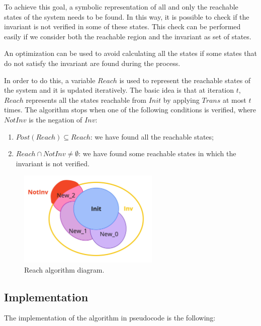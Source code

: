 \documentclass[12pt]{article}
\begin{document}
    To achieve this goal, a symbolic representation of all and only the reachable states of the system needs to be found.
    In this way, it is possible to check if the invariant is not verified in some of these states.
    This check can be performed easily if we consider both the reachable region and the invariant as set of states.

    An optimization can be used to avoid calculating all the states if some states that do not satisfy the invariant are found during the process.

    In order to do this, a variable $Reach$ is used to represent the reachable states of the system and it is updated iteratively.
    The basic idea is that at iteration $t$, $Reach$ represents all the states reachable from $Init$ by applying $Trans$ at most $t$ times.
    The algorithm stops when one of the following conditions is verified, where $NotInv$ is the negation of $Inv$:
    \begin{enumerate}
        \item $Post(Reach) \subseteq Reach $: we have found all the reachable states;
        \item $Reach \cap NotInv \neq \emptyset$: we have found some reachable states in which the invariant is not verified.
    \end{enumerate}

    \begin{figure}[H] 
        \centering
        \includegraphics[width=0.6\textwidth]{reach-diagram.png}
        \caption{Reach algorithm diagram.}
        \label{fig:reach_diagram}
    \end{figure}

    \subsection{Implementation}
    The implementation of the algorithm in pseudocode is the following:
\end{document}
